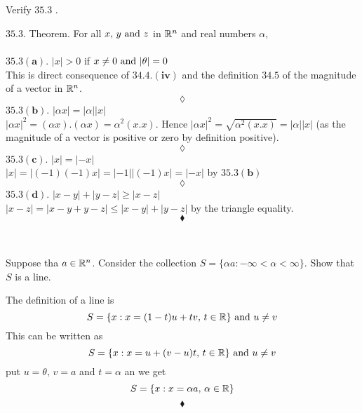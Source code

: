 
\renewcommand{\thesubsection}{\thesection.\arabic{subsection}}
\setcounter{subsection}{0}

\subsection{}
\begin{tcolorbox}
Verify $\mathbf{35.3}$ .
\end{tcolorbox}
$\mathbf{35.3}$. Theorem. For all $x,\, y \text{ and } z$ in $\mathbb{R}^n$ and real numbers $\alpha$,\\\\
$\mathbf{35.3( a)}$. $|x| > 0$ if $x\neq 0\text{ and } |\theta|=0$\\
This is direct consequence of $\mathbf{34.4.(iv)}$ and the definition $\mathbf{34.5}$ of the magnitude of a vector in $\mathbb{R}^n$.
$$\lozenge$$
$\mathbf{35.3( b)}$. $|\alpha x| =|\alpha|| x|$\\
$|\alpha x|^2= (\alpha x).(\alpha x)= \alpha^2 (x.x)$. Hence $|\alpha x|^2= \sqrt{\alpha^2 (x.x)}= |\alpha||x|$ (as the magnitude of a vector is positive or zero by definition positive).
$$\lozenge$$
$\mathbf{35.3( c)}$. $|x|=|-x|$\\
$|x|=|(-1)(-1)x|= |-1||(-1)x|= |-x|$ by $\mathbf{35.3( b)}$
$$\lozenge$$
$\mathbf{35.3( d)}$. $|x-y|+ |y- z| \geq |x-z|$\\
$|x-z|= |x-y+y-z|\leq |x-y|+|y-z|$ by the triangle equality.
$$\blacklozenge$$\\

\subsection{}
\begin{tcolorbox}
Suppose tha $a\in \mathbb{R}^n$. Consider the collection $S=\{\alpha a:-\infty < \alpha <\infty\}$. Show that $S$ is a line.
\end{tcolorbox}
The definition of a line is 
$$S= \{x:x=(1-t)u+tv,\,t\in\mathbb{R}\}\text{ and } u\neq v$$ This can be written as
$$S= \{x:x=u+(v-u)t,\,t\in\mathbb{R}\}\text{ and } u\neq v$$
put $u=\theta,\, v=a $ and $t=\alpha$ an we get 
$$S= \{x:x= \alpha a,\,\alpha\in\mathbb{R}\}$$
$$\blacklozenge$$


